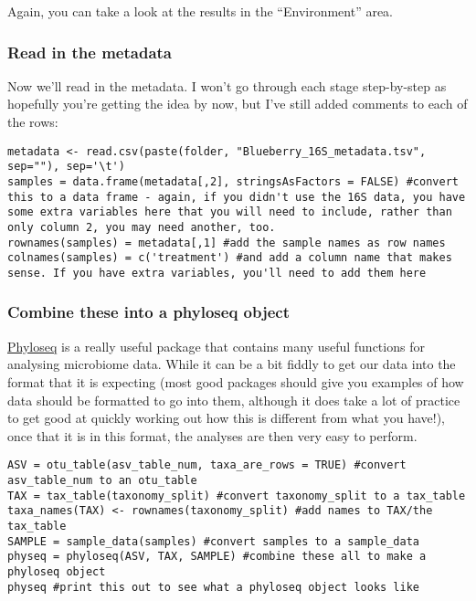 \documentclass[
]{book}
\begin{document}
Again, you can take a look at the results in the ``Environment'' area.

\subsubsection{Read in the metadata}\label{read-in-the-metadata}

Now we'll read in the metadata. I won't go through each stage step-by-step as hopefully you're getting the idea by now, but I've still added comments to each of the rows:

\begin{verbatim}
metadata <- read.csv(paste(folder, "Blueberry_16S_metadata.tsv", sep=""), sep='\t')
samples = data.frame(metadata[,2], stringsAsFactors = FALSE) #convert this to a data frame - again, if you didn't use the 16S data, you have some extra variables here that you will need to include, rather than only column 2, you may need another, too. 
rownames(samples) = metadata[,1] #add the sample names as row names
colnames(samples) = c('treatment') #and add a column name that makes sense. If you have extra variables, you'll need to add them here
\end{verbatim}

\subsubsection{Combine these into a phyloseq object}\label{combine-these-into-a-phyloseq-object}

\href{https://joey711.github.io/phyloseq/}{Phyloseq} is a really useful package that contains many useful functions for analysing microbiome data. While it can be a bit fiddly to get our data into the format that it is expecting (most good packages should give you examples of how data should be formatted to go into them, although it does take a lot of practice to get good at quickly working out how this is different from what you have!), once that it is in this format, the analyses are then very easy to perform.

\begin{verbatim}
ASV = otu_table(asv_table_num, taxa_are_rows = TRUE) #convert asv_table_num to an otu_table
TAX = tax_table(taxonomy_split) #convert taxonomy_split to a tax_table
taxa_names(TAX) <- rownames(taxonomy_split) #add names to TAX/the tax_table
SAMPLE = sample_data(samples) #convert samples to a sample_data
physeq = phyloseq(ASV, TAX, SAMPLE) #combine these all to make a phyloseq object
physeq #print this out to see what a phyloseq object looks like
\end{verbatim}
\end{document}
